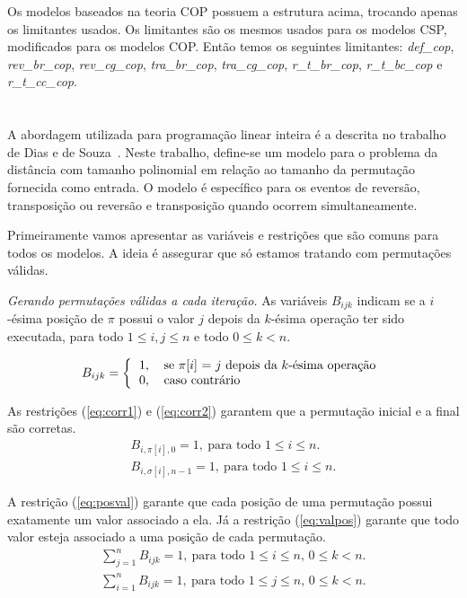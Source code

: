 Os modelos baseados na teoria COP possuem a estrutura acima, trocando
apenas os limitantes usados. Os limitantes são os mesmos usados para
os modelos CSP, modificados para os modelos COP. Então temos os
seguintes limitantes: \textit{def\_cop}, \textit{rev\_br\_cop},
\textit{rev\_cg\_cop}, \textit{tra\_br\_cop}, \textit{tra\_cg\_cop}, 
\textit{r\_t\_br\_cop}, \textit{r\_t\_bc\_cop}
e \textit{r\_t\_cc\_cop}.

\section{\PLI}
\label{sec:pli}
A abordagem utilizada para programação linear inteira é a descrita no
trabalho de Dias e de Souza~\cite{DiasSouza*2007}. Neste trabalho,
define-se um modelo para o problema da distância com tamanho
polinomial em relação ao tamanho da permutação fornecida como
entrada. O modelo é específico para os eventos de reversão,
transposição ou reversão e transposição quando ocorrem
simultaneamente.

Primeiramente vamos apresentar as variáveis e restrições que são
comuns para todos os modelos. A ideia é assegurar que só estamos
tratando com permutações válidas.

\textit{Gerando permutações válidas a cada iteração.} 
As variáveis $B_{ijk}$ indicam se a $i$-ésima posição de $\pi$ possui
o valor $j$ depois da $k$-ésima operação ter sido executada, para todo
$1 \le i, j \le n$ e todo $ 0 \le k < n$.

\[ 
B_{ijk} = \left \{ 
\begin{tabular}{ll} 
  1, & se $\pi[i]$ = $j$ depois da $k$-ésima operação \\ 
  0, & caso contrário
\end{tabular} 
\right .
\]

As restrições (\ref{eq:corr1}) e (\ref{eq:corr2}) garantem que a
permutação inicial e a final são corretas. 
\begin{align} 
  B_{i,\pi[i],0} = 1,~\text{para todo $1 \le i \le n$}. \label{eq:corr1} \\
  B_{i,\sigma[i],n-1} = 1,~\text{para todo $1 \le i \le n$}. \label{eq:corr2}
\end{align}

A restrição (\ref{eq:posval}) garante que cada posição de uma
permutação possui exatamente um valor associado a ela. Já a restrição
(\ref{eq:valpos}) garante que todo valor esteja associado a uma
posição de cada permutação.
\begin{align}
  \sum_{j=1}^{n} B_{ijk} = 1,~\text{para todo $1 \le i \le n$, 
  $0 \le k < n$}. \label{eq:posval} \\
  \sum_{i=1}^{n} B_{ijk} = 1,~\text{para todo $1 \le j \le n$, $0 \le
   k < n$}. \label{eq:valpos}
\end{align}

